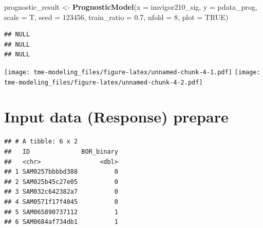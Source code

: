 \documentclass[
  12pt,
]{book}
\newenvironment{Shaded}{\begin{snugshade}}{\end{snugshade}}
\newcommand{\AttributeTok}[1]{\textcolor[rgb]{0.13,0.29,0.53}{#1}}
\newcommand{\ConstantTok}[1]{\textcolor[rgb]{0.56,0.35,0.01}{#1}}
\newcommand{\DecValTok}[1]{\textcolor[rgb]{0.00,0.00,0.81}{#1}}
\newcommand{\FloatTok}[1]{\textcolor[rgb]{0.00,0.00,0.81}{#1}}
\newcommand{\FunctionTok}[1]{\textcolor[rgb]{0.13,0.29,0.53}{\textbf{#1}}}
\newcommand{\NormalTok}[1]{#1}
\newcommand{\OtherTok}[1]{\textcolor[rgb]{0.56,0.35,0.01}{#1}}
\newcommand{\SpecialCharTok}[1]{\textcolor[rgb]{0.81,0.36,0.00}{\textbf{#1}}}
\newcommand{\StringTok}[1]{\textcolor[rgb]{0.31,0.60,0.02}{#1}}
\begin{document}
\begin{Shaded}
\begin{Highlighting}[]
\NormalTok{prognostic\_result }\OtherTok{\textless{}{-}} \FunctionTok{PrognosticModel}\NormalTok{(}\AttributeTok{x           =}\NormalTok{ imvigor210\_sig, }
                                     \AttributeTok{y           =}\NormalTok{ pdata\_prog, }
                                     \AttributeTok{scale       =}\NormalTok{ T, }
                                     \AttributeTok{seed        =} \DecValTok{123456}\NormalTok{, }
                                     \AttributeTok{train\_ratio =} \FloatTok{0.7}\NormalTok{, }
                                     \AttributeTok{nfold       =} \DecValTok{8}\NormalTok{,}
                                     \AttributeTok{plot        =} \ConstantTok{TRUE}\NormalTok{)}
\end{Highlighting}
\end{Shaded}

\begin{verbatim}
## NULL
## NULL
## NULL
\end{verbatim}

\texttt{[image: tme-modeling\_files/figure-latex/unnamed-chunk-4-1.pdf]} \texttt{[image: tme-modeling\_files/figure-latex/unnamed-chunk-4-2.pdf]}

\hypertarget{input-data-response-prepare}{%
\section{Input data (Response) prepare}\label{input-data-response-prepare}}

\begin{Shaded}
\end{Shaded}

\begin{verbatim}
## # A tibble: 6 x 2
##   ID              BOR_binary
##   <chr>                <dbl>
## 1 SAM0257bbbbd388          0
## 2 SAM025b45c27e05          0
## 3 SAM032c642382a7          0
## 4 SAM0571f17f4045          0
## 5 SAM065890737112          1
## 6 SAM0684af734db1          1
\end{verbatim}
\end{document}
